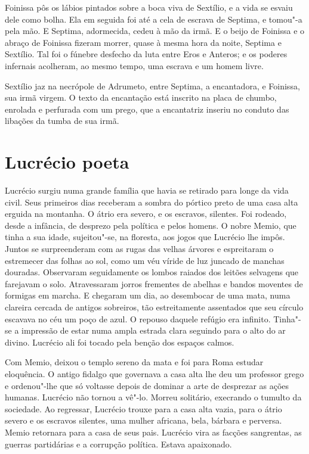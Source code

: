 Foinissa pôs os lábios pintados sobre a boca viva de Sextílio, e a vida se
esvaiu dele como bolha. Ela em seguida foi até a cela de escrava de
Septima, e tomou"-a pela mão. E Septima, adormecida, cedeu à mão da irmã. E
o beijo de Foinissa e o abraço de Foinissa fizeram morrer, quase à mesma
hora da noite, Septima e Sextílio. Tal foi o fúnebre desfecho da luta
entre Eros e Anteros; e os poderes infernais acolheram, ao mesmo tempo,
uma escrava e um homem livre.

Sextílio jaz na necrópole de Adrumeto, entre Septima, a encantadora, e
Foinissa, sua irmã virgem. O texto da encantação está inscrito na placa de
chumbo, enrolada e perfurada com um prego, que a encantatriz inseriu no
conduto das libações da tumba de sua irmã.

\chapter{Lucrécio poeta}

Lucrécio surgiu numa grande família que havia se retirado para longe da
vida civil. Seus primeiros dias receberam a sombra do pórtico preto de uma
casa alta erguida na montanha. O átrio era severo, e os escravos,
silentes. Foi rodeado, desde a infância, de desprezo pela política e pelos
homens. O nobre Memio, que tinha a sua idade, sujeitou"-se, na floresta,
aos jogos que Lucrécio lhe impôs. Juntos se surpreenderam com as rugas das
velhas árvores e espreitaram o estremecer das folhas ao sol, como um véu
víride de luz juncado de manchas douradas. Observaram seguidamente os
lombos raiados dos leitões selvagens que farejavam o solo. Atravessaram
jorros frementes de abelhas e bandos moventes de formigas em marcha. E
chegaram um dia, ao desembocar de uma mata, numa clareira cercada de
antigos sobreiros, tão estreitamente assentados que seu círculo escavava
no céu um poço de azul. O repouso daquele refúgio era infinito. Tinha"-se a
impressão de estar numa ampla estrada clara seguindo para o alto do ar
divino. Lucrécio ali foi tocado pela benção dos espaços calmos.

Com Memio, deixou o templo sereno da mata e foi para Roma estudar
eloquência. O antigo fidalgo que governava a casa alta lhe deu um
professor grego e ordenou"-lhe que só voltasse depois de dominar a arte de
desprezar as ações humanas. Lucrécio não tornou a vê"-lo. Morreu solitário,
execrando o tumulto da sociedade. Ao regressar, Lucrécio trouxe para a
casa alta vazia, para o átrio severo e os escravos silentes, uma mulher
africana, bela, bárbara e perversa. Memio retornara para a casa de seus
pais. Lucrécio vira as facções sangrentas, as guerras partidárias e a
corrupção política. Estava apaixonado.

